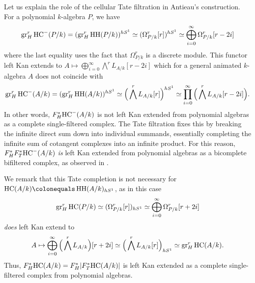 \documentclass[oneside,a4paper]{amsart}
\begin{document}
\begin{remark}\label{rem:ben_tate}
Let us explain the role of the cellular Tate filtration in Antieau's construction. For a polynomial $k$-algebra $P$, we have 
\[
\operatorname{gr}^r_H \mathrm{HC}^-(P/k) = (\operatorname{gr}^r_H \operatorname{HH}(P/k))^{hS^{1}} \simeq (\Omega^r_{P/k}[r])^{hS^1} \simeq \bigoplus_{i=0}^\infty \Omega^r_{P/k}[r-2i]
\]
where the last equality uses the fact that $\Omega^r_{P/k}$ is a discrete module. This functor left Kan extends to $A \mapsto \bigoplus_{i=0}^\infty \bigwedge^r L_{A/k}[r-2i]$ which for a general animated $k$-algebra $A$ does not coincide with 
\[
\operatorname{gr}^r_H \mathrm{HC}^-(A/k) = (\operatorname{gr}^r_H \operatorname{HH}(A/k))^{hS^{1}} \simeq
    \Big(\bigwedge^r L_{A/k}[r]\Big)^{hS^1} \simeq \prod_{i=0}^\infty \Big(\bigwedge^r L_{A/k}[r-2i]\Big).
\]
In other words, $F_H^* \mathrm{HC}^-(A/k)$ is not left Kan extended from polynomial algebras as a complete single-filtered complex. The Tate filtration fixes this by breaking the infinite direct sum down into individual summands, essentially completing the infinite sum of cotangent complexes into an infinite product. For this reason, $F_H^* F_T^* \mathrm{HC}^-(A/k)$ \emph{is} left Kan extended from polynomial algebras as a bicomplete bifiltered complex, as observed in \cite[{Remark 4.4}]{antieau2019periodic}. 

We remark that this Tate completion is not necessary for $\HC(A/k) \colonequals \HH(A/k)_{hS^1}$, as in this case 
\[
\operatorname{gr}^r_H \mathrm{HC}(P/k) \simeq (\Omega^r_{P/k}[r])_{hS^1} \simeq \bigoplus_{i=0}^\infty \Omega^r_{P/k}[r+2i]
\]
\emph{does} left Kan extend to 
\[
A \mapsto \bigoplus_{i=0}^\infty \Big(\bigwedge^r L_{A/k} \Big)[r+2i] \simeq \Big(\bigwedge^r L_{A/k}[r]\Big)_{hS^1} \simeq \operatorname{gr}^r_H \mathrm{HC}(A/k).
\]
Thus, $F^*_H \mathrm{HC}(A/k) = F^*_H |F^*_T \mathrm{HC}(A/k)|$ is left Kan extended as a complete single-filtered complex from polynomial algebras. 
\end{remark}
\end{document}
